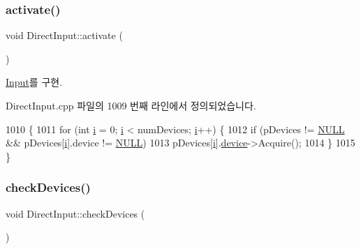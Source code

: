\subsubsection{\texorpdfstring{activate()}{activate()}}
{\footnotesize\ttfamily void Direct\+Input\+::activate (\begin{DoxyParamCaption}{ }\end{DoxyParamCaption})\hspace{0.3cm}{\ttfamily [virtual]}}



\mbox{\hyperlink{class_input_a5917709c5d9cf1270d430667982895d1}{Input}}를 구현.



Direct\+Input.\+cpp 파일의 1009 번째 라인에서 정의되었습니다.


\begin{DoxyCode}
1010 \{
1011     \textcolor{keywordflow}{for} (\textcolor{keywordtype}{int} \mbox{\hyperlink{expr-lex_8cpp_acb559820d9ca11295b4500f179ef6392}{i}} = 0; \mbox{\hyperlink{expr-lex_8cpp_acb559820d9ca11295b4500f179ef6392}{i}} < numDevices; \mbox{\hyperlink{expr-lex_8cpp_acb559820d9ca11295b4500f179ef6392}{i}}++) \{
1012         \textcolor{keywordflow}{if} (pDevices != \mbox{\hyperlink{getopt1_8c_a070d2ce7b6bb7e5c05602aa8c308d0c4}{NULL}} && pDevices[\mbox{\hyperlink{expr-lex_8cpp_acb559820d9ca11295b4500f179ef6392}{i}}].device != \mbox{\hyperlink{getopt1_8c_a070d2ce7b6bb7e5c05602aa8c308d0c4}{NULL}})
1013             pDevices[\mbox{\hyperlink{expr-lex_8cpp_acb559820d9ca11295b4500f179ef6392}{i}}].\mbox{\hyperlink{structdevice_info_a4e2b017b67b850eb267097f95776273f}{device}}->Acquire();
1014     \}
1015 \}
\end{DoxyCode}
\mbox{\label{class_direct_input_a59a88d57b359bd26c800579edeb19419}} 
\subsubsection{\texorpdfstring{check\+Devices()}{checkDevices()}}
{\footnotesize\ttfamily void Direct\+Input\+::check\+Devices (\begin{DoxyParamCaption}{ }\end{DoxyParamCaption})\hspace{0.3cm}{\ttfamily [virtual]}}



